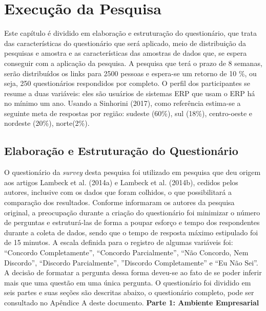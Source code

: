 \chapter{Execução da Pesquisa} \label{Execução da Pesquisa}

Este capítulo é dividido em elaboração e estruturação do questionário, que trata das características do questionário que será aplicado, meio de distribuição da pesquisas e amostra e as características das amostras de dados que, se espera conseguir com a aplicação da pesquisa.\newline 
\indent A pesquisa que terá o prazo de 8 semanas, serão distribuídos os links para 2500 pessoas e espera-se um retorno de 10 \%, ou seja, 250 questionários respondidos por completo. O perfil dos participantes se resume a duas variáveis: eles são usuários de sistemas ERP que usam o ERP há no mínimo um ano.\newline 
\indent Usando a Sinhorini (2017), como referência estima-se a seguinte meta de respostas por região: sudeste (60\%), sul (18\%), centro-oeste e nordeste (20\%), norte(2\%).

\section{Elaboração e Estruturação do Questionário} \label{Elaboração e Estruturação do Questionário}

O questionário da \textit{survey} desta pesquisa foi utilizado em pesquisa que deu origem aos artigos Lambeck et al. (2014a) e Lambeck et al. (2014b), cedidos pelos autores, inclusive com os dados que foram colhidos, o que possibilitará a comparação dos resultados. Conforme informaram os autores da pesquisa original, a preocupação durante a criação do questionário foi minimizar o número de perguntas e estruturá-las de forma a poupar esforço e tempo dos respondentes durante a coleta de dados, sendo que o tempo de resposta máximo estipulado foi de 15 minutos.\newline 
\indent A escala definida para o registro de algumas variáveis foi: “Concordo Completamente”, “Concordo Parcialmente”, “Não Concordo, Nem Discordo”, “Discordo Parcialmente”, ”Discordo Completamente” e “Eu Não Sei”. A decisão de formatar a pergunta dessa forma deveu-se ao fato de se poder inferir mais que uma questão em uma única pergunta. O questionário foi dividido em seis partes e suas seções são descritas abaixo, o questionário completo, pode ser consultado no Apêndice A deste documento.\newline 
\newline
\noindent \textbf{Parte 1: Ambiente Empresarial} \newline

